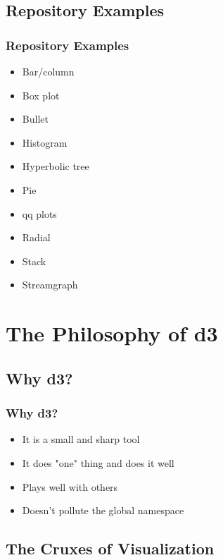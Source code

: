 \documentclass{beamer}
\begin{document}
\subsection{Repository Examples}

\begin{frame}
\frametitle{Repository Examples}
\begin{itemize}
\item Bar/column 
\item Box plot
\item Bullet
\item Histogram
\item Hyperbolic tree
\item Pie 
\item qq plots
\item Radial
\item Stack
\item Streamgraph
\end{itemize}
\end{frame}



\section{The Philosophy of d3}

\subsection{Why d3?}

\begin{frame}
\frametitle{Why d3?}
\begin{itemize}
\item It is a small and sharp tool 
\item It does "one" thing and does it well
\item Plays well with others
\item Doesn't pollute the global namespace
\end{itemize}
\end{frame}



\subsection{The Cruxes of Visualization}
\end{document}
